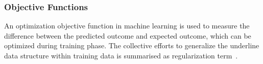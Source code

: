 \subsubsection{Objective Functions}
An optimization objective function in machine learning is used to measure the difference between the predicted outcome and expected outcome, which can be optimized during training phase. The collective efforts to generalize the underline data structure within training data is summarised as regularization term~\cite{goodfellow_2015}.  